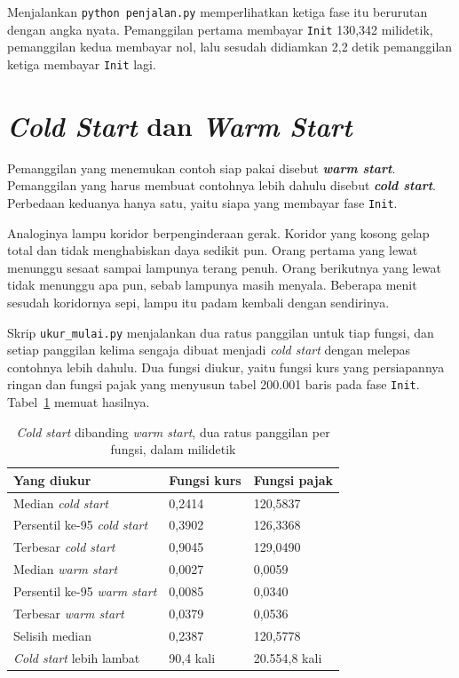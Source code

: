 Menjalankan \texttt{python penjalan.py} memperlihatkan ketiga fase itu
berurutan dengan angka nyata. Pemanggilan pertama membayar
\texttt{Init} 130,342 milidetik, pemanggilan kedua membayar nol, lalu sesudah
didiamkan 2,2 detik pemanggilan ketiga membayar \texttt{Init} lagi.

\section{\textit{Cold Start} dan \textit{Warm Start}}

Pemanggilan yang menemukan contoh siap pakai disebut \textbf{\textit{warm
start}}. Pemanggilan yang harus membuat contohnya lebih dahulu disebut
\textbf{\textit{cold start}}. Perbedaan keduanya hanya satu, yaitu siapa yang
membayar fase \texttt{Init}.

Analoginya lampu koridor berpenginderaan gerak. Koridor yang kosong gelap total
dan tidak menghabiskan daya sedikit pun. Orang pertama yang lewat menunggu
sesaat sampai lampunya terang penuh. Orang berikutnya yang lewat tidak menunggu
apa pun, sebab lampunya masih menyala. Beberapa menit sesudah koridornya sepi,
lampu itu padam kembali dengan sendirinya.

Skrip \texttt{ukur\_mulai.py} menjalankan dua ratus panggilan untuk tiap
fungsi, dan setiap panggilan kelima sengaja dibuat menjadi \textit{cold start}
dengan melepas contohnya lebih dahulu. Dua fungsi diukur, yaitu fungsi kurs yang persiapannya
ringan dan fungsi pajak yang menyusun tabel 200.001 baris pada fase
\texttt{Init}. Tabel~\ref{tab:mulai-dingin} memuat hasilnya.

\begin{table}[htbp]
  \centering
  \caption{\textit{Cold start} dibanding \textit{warm start}, dua ratus
    panggilan per fungsi, dalam milidetik}
  \label{tab:mulai-dingin}
  \begin{tabularx}{\textwidth}{|X|l|l|}
    \hline
    \textbf{Yang diukur} & \textbf{Fungsi kurs} & \textbf{Fungsi pajak} \\
    \hline
    Median \textit{cold start} & 0,2414 & 120,5837 \\
    \hline
    Persentil ke-95 \textit{cold start} & 0,3902 & 126,3368 \\
    \hline
    Terbesar \textit{cold start} & 0,9045 & 129,0490 \\
    \hline
    Median \textit{warm start} & 0,0027 & 0,0059 \\
    \hline
    Persentil ke-95 \textit{warm start} & 0,0085 & 0,0340 \\
    \hline
    Terbesar \textit{warm start} & 0,0379 & 0,0536 \\
    \hline
    Selisih median & 0,2387 & 120,5778 \\
    \hline
    \textit{Cold start} lebih lambat & 90,4 kali & 20.554,8 kali \\
    \hline
  \end{tabularx}
\end{table}

